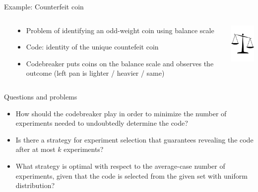 \documentclass[final]{beamer}
\begin{document}
\begin{frame}{}
\begin{columns}[t]
\begin{column}{.48\linewidth}
    \begin{block}{Example: Counterfeit coin}
    \begin{columns}
      \begin{column}{\parindent}\end{column}
      \begin{column}{.78\textwidth}
      \begin{itemize}
        \item Problem of identifying an odd-weight coin using balance scale
        \item Code: identity of the unique countefeit coin
        \item Codebreaker puts coins on the balance scale and observes the outcome (left pan is lighter / heavier / same)
      \end{itemize}    
      \end{column}
      \begin{column}{.22\textwidth}
        \includegraphics[width=2cm]{../pictures/scales.pdf}
      \end{column}
    \end{columns}
    \end{block}
      
    \begin{block}{Questions and problems}
      \begin{itemize}
      \item How should the codebreaker play in order to minimize the number of experiments needed to undoubtedly determine the code?
      \item Is there a strategy for experiment selection that guarantees revealing the code after at most $k$ experiments?
      \item What strategy is optimal with respect to the average-case number of experiments, given that the code is selected from the given set with uniform distribution?
      \end{itemize}
    \end{block}


\end{column}
\end{columns}
\end{frame}
\end{document}
